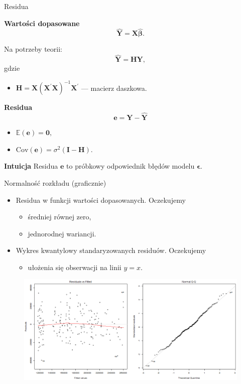 \documentclass[a4paper, 11pt]{beamer}
\begin{document}
	\begin{frame}{Residua}
		\begin{block}{\textbf{Wartości dopasowane}} \[
				\hat{\boldsymbol{Y}} = \boldsymbol{X} \hat{\boldsymbol{\beta}}.
			\]
		\end{block}
		Na potrzeby teorii: \[
			\hat{\boldsymbol{Y}} = \boldsymbol{H} \boldsymbol{Y},
		\]
		gdzie
		\begin{itemize}
		  \item $\boldsymbol{H} = \boldsymbol{X} \left(\boldsymbol{X}^{\prime} \boldsymbol{X}\right)^{-1} \boldsymbol{X}^{\prime}$ --- macierz daszkowa.
		\end{itemize}
		\begin{block}{\textbf{Residua}}
			\[
				\boldsymbol{e} = \boldsymbol{Y} - \hat{\boldsymbol{Y}}
			\]
		\end{block}
		\begin{itemize}
			\item $\mathbb{E}\left(\boldsymbol{e}\right) = \boldsymbol{0},$
			\item $\mbox{Cov}\left(\boldsymbol{e}\right) = \sigma^2 \left(\boldsymbol{I} - \boldsymbol{H}\right).$
		\end{itemize}
		\begin{alert}{\textbf{Intuicja}}
			Residua $\boldsymbol{e}$ to próbkowy odpowiednik błędów modelu $\boldsymbol{\epsilon}.$
		\end{alert}
	\end{frame}
	
	\begin{frame}{Normalność rozkładu (graficznie)}
		\begin{itemize}
			\item Residua w funkcji wartości dopasowanych. Oczekujemy
			\begin{itemize}
				\item średniej równej zero,
				\item jednorodnej wariancji.
			\end{itemize}
			\item Wykres kwantylowy standaryzowanych residuów. Oczekujemy
			\begin{itemize}
				\item ułożenia się obserwacji na linii $y=x.$
			\end{itemize}
		\end{itemize}
		\begin{figure}
			\centering
			\includegraphics[scale=0.45]{gfx/normality}
		\end{figure}
	\end{frame}
	
\end{document}
